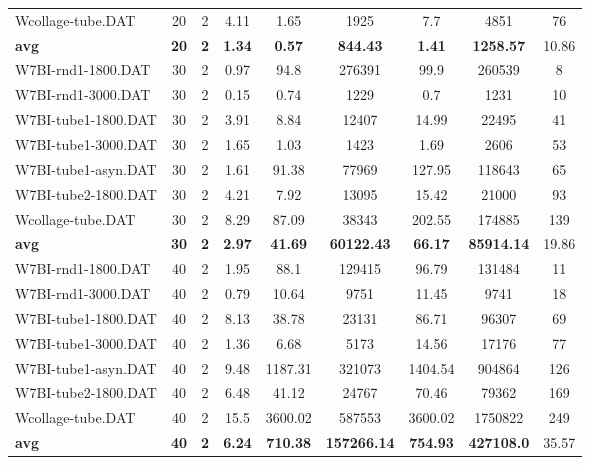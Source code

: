 \begin{table}[!ht]
{\begin{tabular}{lcccccccc}
Wcollage-tube.DAT & 20 & 2 & 4.11 &  \textcolor{blue2}{1.65} & 1925 & 7.7 & 4851 & 76 \\
\cline{1-9} \textbf{avg} & \textbf{20} & \textbf{2} & \textbf{1.34} & \textbf{0.57} & \textbf{844.43} & \textbf{1.41} & \textbf{1258.57} & 10.86\\ \cline{1-9}
W7BI-rnd1-1800.DAT & 30 & 2 &  \textcolor{blue2}{0.97} & 94.8 & 276391 & 99.9 & 260539 & 8 \\
W7BI-rnd1-3000.DAT & 30 & 2 &  \textcolor{blue2}{0.15} & 0.74 & 1229 & 0.7 & 1231 & 10 \\
W7BI-tube1-1800.DAT & 30 & 2 &  \textcolor{blue2}{3.91} & 8.84 & 12407 & 14.99 & 22495 & 41 \\
W7BI-tube1-3000.DAT & 30 & 2 & 1.65 &  \textcolor{blue2}{1.03} & 1423 & 1.69 & 2606 & 53 \\
W7BI-tube1-asyn.DAT & 30 & 2 &  \textcolor{blue2}{1.61} & 91.38 & 77969 & 127.95 & 118643 & 65 \\
W7BI-tube2-1800.DAT & 30 & 2 &  \textcolor{blue2}{4.21} & 7.92 & 13095 & 15.42 & 21000 & 93 \\
Wcollage-tube.DAT & 30 & 2 &  \textcolor{blue2}{8.29} & 87.09 & 38343 & 202.55 & 174885 & 139 \\
\cline{1-9} \textbf{avg} & \textbf{30} & \textbf{2} & \textbf{2.97} & \textbf{41.69} & \textbf{60122.43} & \textbf{66.17} & \textbf{85914.14} & 19.86\\ \cline{1-9}
W7BI-rnd1-1800.DAT & 40 & 2 &  \textcolor{blue2}{1.95} & 88.1 & 129415 & 96.79 & 131484 & 11 \\
W7BI-rnd1-3000.DAT & 40 & 2 &  \textcolor{blue2}{0.79} & 10.64 & 9751 & 11.45 & 9741 & 18 \\
W7BI-tube1-1800.DAT & 40 & 2 &  \textcolor{blue2}{8.13} & 38.78 & 23131 & 86.71 & 96307 & 69 \\
W7BI-tube1-3000.DAT & 40 & 2 &  \textcolor{blue2}{1.36} & 6.68 & 5173 & 14.56 & 17176 & 77 \\
W7BI-tube1-asyn.DAT & 40 & 2 &  \textcolor{blue2}{9.48} & 1187.31 & 321073 & 1404.54 & 904864 & 126 \\
W7BI-tube2-1800.DAT & 40 & 2 &  \textcolor{blue2}{6.48} & 41.12 & 24767 & 70.46 & 79362 & 169 \\
Wcollage-tube.DAT & 40 & 2 &  \textcolor{blue2}{15.5} & 3600.02 & 587553 & 3600.02 & 1750822 & 249 \\
\cline{1-9} \textbf{avg} & \textbf{40} & \textbf{2} & \textbf{6.24} & \textbf{710.38} & \textbf{157266.14} & \textbf{754.93} & \textbf{427108.0} & 35.57\\ \cline{1-9}

\end{tabular}}
\end{table}
